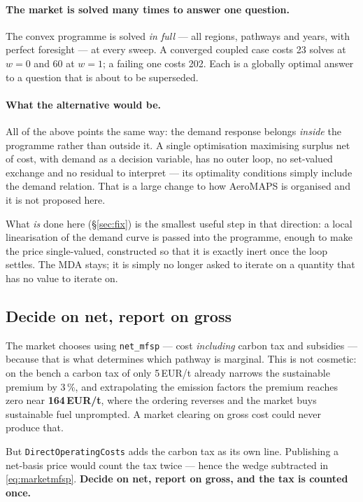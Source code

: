 \documentclass[11pt,a4paper]{article}
\newcommand{\var}[1]{\texttt{\small #1}}
\begin{document}
\paragraph{The market is solved many times to answer one question.} The convex programme
is solved \emph{in full} --- all regions, pathways and years, with perfect foresight ---
at every sweep. A converged coupled case costs 23 solves at $w=0$ and 60 at $w=1$; a
failing one costs 202. Each is a globally optimal answer to a question that is about to
be superseded.

\paragraph{What the alternative would be.} All of the above points the same way: the
demand response belongs \emph{inside} the programme rather than outside it. A single
optimisation maximising surplus net of cost, with demand as a decision variable, has no
outer loop, no set-valued exchange and no residual to interpret --- its optimality
conditions simply include the demand relation. That is a large change to how AeroMAPS is
organised and it is not proposed here.

What \emph{is} done here (\S\ref{sec:fix}) is the smallest useful step in that direction:
a local linearisation of the demand curve is passed into the programme, enough to make
the price single-valued, constructed so that it is exactly inert once the loop settles.
The MDA stays; it is simply no longer asked to iterate on a quantity that has no value
to iterate on.

\subsection{Decide on net, report on gross}
\label{sec:netgross}

The market chooses using \var{net\_mfsp} --- cost \emph{including} carbon tax and
subsidies --- because that is what determines which pathway is marginal. This is not
cosmetic: on the bench a carbon tax of only 5\,EUR/t already narrows the sustainable
premium by 3\,\%, and extrapolating the emission factors the premium reaches zero near
\textbf{164\,EUR/t}, where the ordering reverses and the market buys sustainable fuel
unprompted. A market clearing on gross cost could never produce that.

But \var{DirectOperatingCosts} adds the carbon tax as its own line. Publishing a
net-basis price would count the tax twice --- hence the wedge subtracted in
\eqref{eq:marketmfsp}. \textbf{Decide on net, report on gross, and the tax is counted
once.}
\end{document}
